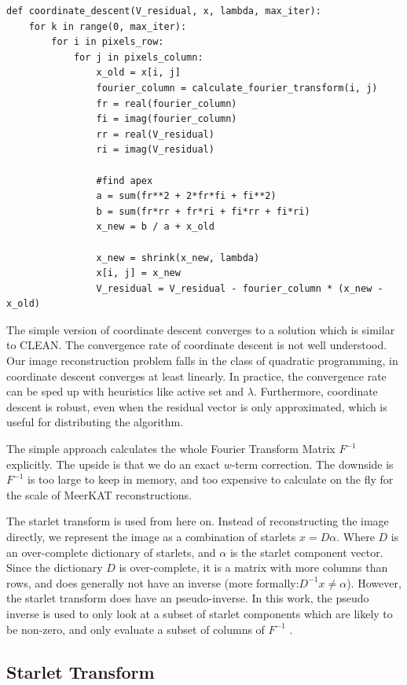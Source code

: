 \begin{lstlisting} 
def coordinate_descent(V_residual, x, lambda, max_iter):
	for k in range(0, max_iter):
		for i in pixels_row:
			for j in pixels_column:
				x_old = x[i, j]
				fourier_column = calculate_fourier_transform(i, j)
				fr = real(fourier_column)
				fi = imag(fourier_column)
				rr = real(V_residual)
				ri = imag(V_residual)
				
				#find apex
				a = sum(fr**2 + 2*fr*fi + fi**2)
				b = sum(fr*rr + fr*ri + fi*rr + fi*ri)
				x_new = b / a + x_old
				
				x_new = shrink(x_new, lambda)
				x[i, j] = x_new
				V_residual = V_residual - fourier_column * (x_new - x_old)
\end{lstlisting}\label{cd:basic}

The simple version of coordinate descent converges to a solution which is similar to CLEAN. The convergence rate of coordinate descent is not well understood. Our image reconstruction problem falls in the class of quadratic programming, in coordinate descent converges at least linearly\cite{luo1992convergence}. In practice, the convergence rate can be sped up with heuristics like active set\cite{activeset} and $\lambda$\cite{lambda}. Furthermore, coordinate descent is robust, even when the residual vector is only approximated, which is useful for distributing the algorithm.

The simple approach calculates the whole Fourier Transform Matrix $F^{-1}$ explicitly. The upside is that we do an exact $w$-term correction. The downside is $F^{-1}$ is too large to keep in memory, and too expensive to calculate on the fly for the scale of MeerKAT reconstructions. 

The starlet transform is used from here on. Instead of reconstructing the image directly, we represent the image as a combination of starlets $x = D\alpha$. Where $D$ is an over-complete dictionary of starlets, and $\alpha$ is the starlet component vector. Since the dictionary $D$ is over-complete, it is a matrix with more columns than rows, and does generally not have an inverse (more formally:$D^{-1}x \neq \alpha$). However, the starlet transform does have an pseudo-inverse. In this work, the pseudo inverse is used to only look at a subset of starlet components which are likely to be non-zero, and only evaluate a subset of columns of $F^{-1}$ .

\subsection{Starlet Transform} \label{cd:starlets}

